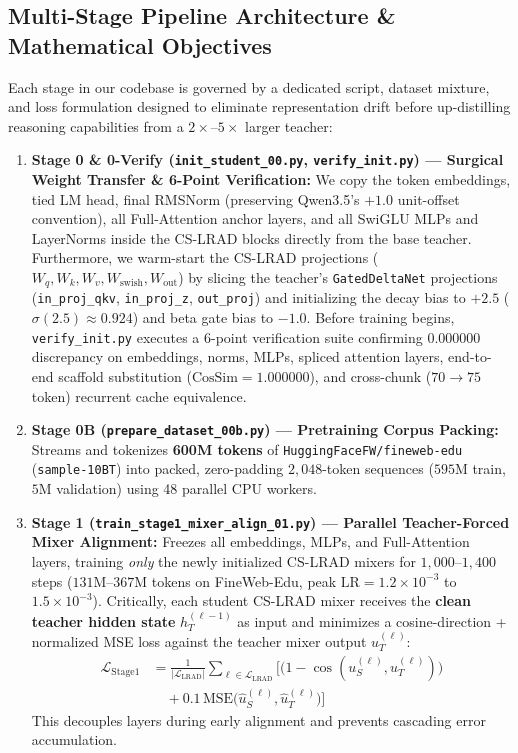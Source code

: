 \documentclass[twocolumn,10pt]{article}
\begin{document}
\subsection{Multi-Stage Pipeline Architecture \& Mathematical Objectives}
Each stage in our codebase is governed by a dedicated script, dataset mixture, and loss formulation designed to eliminate representation drift before up-distilling reasoning capabilities from a $2\times$--$5\times$ larger teacher:

\begin{enumerate}
    \item \textbf{Stage 0 \& 0-Verify (\texttt{init\_student\_00.py}, \texttt{verify\_init.py}) --- Surgical Weight Transfer \& 6-Point Verification:}
    We copy the token embeddings, tied LM head, final RMSNorm (preserving Qwen3.5's $+1.0$ unit-offset convention), all Full-Attention anchor layers, and all SwiGLU MLPs and LayerNorms inside the CS-LRAD blocks directly from the base teacher. Furthermore, we warm-start the CS-LRAD projections ($W_q, W_k, W_v, W_{\text{swish}}, W_{\text{out}}$) by slicing the teacher's \texttt{GatedDeltaNet} projections (\texttt{in\_proj\_qkv}, \texttt{in\_proj\_z}, \texttt{out\_proj}) and initializing the decay bias to $+2.5$ ($\sigma(2.5) \approx 0.924$) and beta gate bias to $-1.0$. Before training begins, \texttt{verify\_init.py} executes a 6-point verification suite confirming $0.000000$ discrepancy on embeddings, norms, MLPs, spliced attention layers, end-to-end scaffold substitution ($\text{CosSim} = 1.000000$), and cross-chunk ($70 \to 75$ token) recurrent cache equivalence.

    \item \textbf{Stage 0B (\texttt{prepare\_dataset\_00b.py}) --- Pretraining Corpus Packing:}
    Streams and tokenizes \textbf{600M tokens} of \texttt{HuggingFaceFW/fineweb-edu} (\texttt{sample-10BT}) into packed, zero-padding $2,048$-token sequences ($595\text{M}$ train, $5\text{M}$ validation) using 48 parallel CPU workers.

    \item \textbf{Stage 1 (\texttt{train\_stage1\_mixer\_align\_01.py}) --- Parallel Teacher-Forced Mixer Alignment:}
    Freezes all embeddings, MLPs, and Full-Attention layers, training \textit{only} the newly initialized CS-LRAD mixers for $1,000$--$1,400$ steps ($131\text{M}$--$367\text{M}$ tokens on FineWeb-Edu, peak $\text{LR} = 1.2\times 10^{-3}$ to $1.5\times 10^{-3}$). Critically, each student CS-LRAD mixer receives the \textbf{clean teacher hidden state} $h_{T}^{(\ell-1)}$ as input and minimizes a cosine-direction + normalized MSE loss against the teacher mixer output $u_T^{(\ell)}$:
    \begin{align}
    \mathcal{L}_{\text{Stage1}} &= \frac{1}{|\mathcal{L}_{\text{LRAD}}|} \sum_{\ell \in \mathcal{L}_{\text{LRAD}}} \Big[ \big(1 - \cos(u_S^{(\ell)}, u_T^{(\ell)})\big) \nonumber \\
    &\quad + 0.1 \, \text{MSE}\big(\hat{u}_S^{(\ell)}, \hat{u}_T^{(\ell)}\big) \Big]
    \end{align}
    This decouples layers during early alignment and prevents cascading error accumulation.


\end{enumerate}
\end{document}

